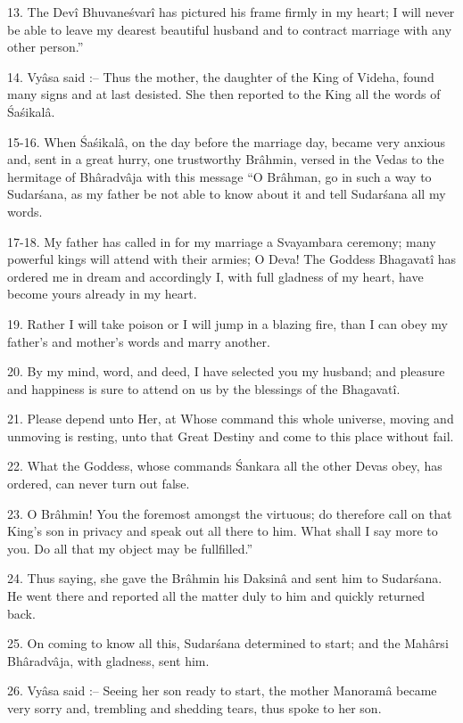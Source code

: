 13. The Dev\^i Bhuvane\'svar\^i has pictured his frame firmly in my heart; I will never be able to leave my dearest beautiful husband and to contract marriage with any other person.''

14. Vy\^asa said :-- Thus the mother, the daughter of the King of Videha, found many signs and at last desisted. She then reported to the King all the words of \'Sa\'sikal\^a.

15-16. When \'Sa\'sikal\^a, on the day before the marriage day, became very anxious and, sent in a great hurry, one trustworthy Br\^ahmin, versed in the Vedas to the hermitage of Bh\^aradv\^aja with this message ``O Br\^ahman, go in such a way to Sudar\'sana, as my father be not able to know about it and tell Sudar\'sana all my words.

17-18. My father has called in for my marriage a Svayambara ceremony; many powerful kings will attend with their armies; O Deva! The Goddess Bhagavat\^i has ordered me in dream and accordingly I, with full gladness of my heart, have become yours already in my heart.

19. Rather I will take poison or I will jump in a blazing fire, than I can obey my father's and mother's words and marry another.

20. By my mind, word, and deed, I have selected you my husband; and pleasure and happiness is sure to attend on us by the blessings of the Bhagavat\^i.

21. Please depend unto Her, at Whose command this whole universe, moving and unmoving is resting, unto that Great Destiny and come to this place without fail.

22. What the Goddess, whose commands \'Sankara all the other Devas obey, has ordered, can never turn out false.

23. O Br\^ahmin! You the foremost amongst the virtuous; do therefore call on that King's son in privacy and speak out all there to him. What shall I say more to you. Do all that my object may be fullfilled.''

24. Thus saying, she gave the Br\^ahmin his Daksin\^a and sent him to Sudar\'sana. He went there and reported all the matter duly to him and quickly returned back.

25. On coming to know all this, Sudar\'sana determined to start; and the Mah\^arsi Bh\^aradv\^aja, with gladness, sent him.

26. Vy\^asa said :-- Seeing her son ready to start, the mother Manoram\^a became very sorry and, trembling and shedding tears, thus spoke to her son.

